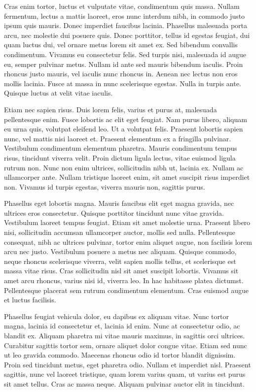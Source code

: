 \documentclass[11pt,a4paper,twocolumn]{article}
\begin{document}
Cras enim tortor, luctus et vulputate vitae, condimentum quis massa. Nullam fermentum, lectus a mattis laoreet, eros nunc interdum nibh, in commodo justo ipsum quis mauris. Donec imperdiet faucibus lacinia. Phasellus malesuada porta arcu, nec molestie dui posuere quis. Donec porttitor, tellus id egestas feugiat, dui quam luctus dui, vel ornare metus lorem sit amet ex. Sed bibendum convallis condimentum. Vivamus eu consectetur felis. Sed turpis nisi, malesuada id augue eu, semper pulvinar metus. Nullam id ante sed mauris bibendum iaculis. Proin rhoncus justo mauris, vel iaculis nunc rhoncus in. Aenean nec lectus non eros mollis lacinia. Fusce at massa in nunc scelerisque egestas. Nulla in turpis ante. Quisque luctus at velit vitae iaculis.

Etiam nec sapien risus. Duis lorem felis, varius et purus at, malesuada pellentesque enim. Fusce lobortis ac elit eget feugiat. Nam purus libero, aliquam eu urna quis, volutpat eleifend leo. Ut a volutpat felis. Praesent lobortis sapien nunc, vel mattis nisi laoreet et. Praesent elementum ex a fringilla pulvinar. Vestibulum condimentum elementum pharetra. Mauris condimentum tempus risus, tincidunt viverra velit. Proin dictum ligula lectus, vitae euismod ligula rutrum non. Nunc non enim ultrices, sollicitudin nibh ut, lacinia ex. Nullam ac ullamcorper ante. Nullam tristique laoreet enim, sit amet suscipit risus imperdiet non. Vivamus id turpis egestas, viverra mauris non, sagittis purus.

Phasellus eget lobortis magna. Mauris faucibus elit eget magna gravida, nec ultrices eros consectetur. Quisque porttitor tincidunt nunc vitae gravida. Vestibulum laoreet tempus feugiat. Etiam sit amet molestie urna. Praesent libero nisi, sollicitudin accumsan ullamcorper auctor, mollis sed nulla. Pellentesque consequat, nibh ac ultrices pulvinar, tortor enim aliquet augue, non facilisis lorem arcu nec justo. Vestibulum posuere a metus nec aliquam. Quisque commodo, neque rhoncus scelerisque viverra, velit sapien mollis tellus, et scelerisque est massa vitae risus. Cras sollicitudin nisl sit amet suscipit lobortis. Vivamus sit amet arcu rhoncus, varius nisi id, viverra leo. In hac habitasse platea dictumst. Pellentesque placerat sem rutrum condimentum elementum. Cras euismod augue et luctus facilisis.

Phasellus feugiat vehicula dolor, eu dapibus ex aliquam vitae. Nunc tortor magna, lacinia id consectetur et, lacinia id enim. Nunc at consectetur odio, ac blandit ex. Aliquam pharetra mi vitae mauris maximus, in sagittis orci ultrices. Curabitur sagittis tortor sem, ornare aliquet dolor congue vitae. Etiam sed nunc ut leo gravida commodo. Maecenas rhoncus odio id tortor blandit dignissim. Proin sed tincidunt metus, eget pharetra odio. Nullam et imperdiet nisl. Praesent sagittis, nunc vel laoreet tristique, quam lorem varius quam, ut varius est purus sit amet tellus. Cras ac massa neque. Aliquam pulvinar auctor elit in tincidunt.
\end{document}
